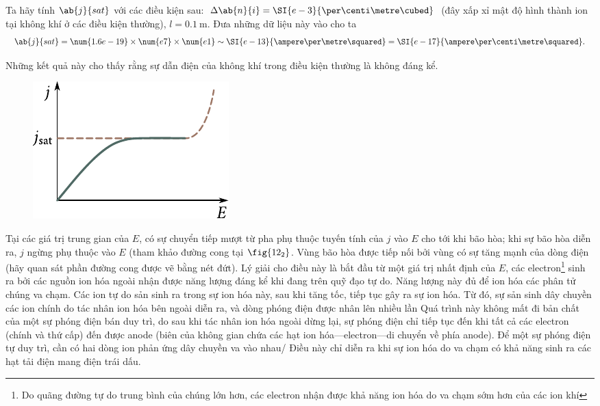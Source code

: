 Ta hãy tính $\ab{j}{sat}$ với các điều kiện sau: $\Delta{\ab{n}{i}} = \SI{e-3}{\per\centi\metre\cubed}$ (đây xấp xỉ mật độ hình thành ion tại không khí ở các điều kiện thường), $l = \SI{0.1}{\metre}$.
Đưa những dữ liệu này vào  cho ta
\begin{equation*}
    \ab{j}{sat} = \num{1.6e-19} \times \num{e7} \times \num{e1} \sim \SI{e-13}{\ampere\per\metre\squared} = \SI{e-17}{\ampere\per\centi\metre\squared}.
\end{equation*}

\noindent
Những kết quả này cho thấy rằng sự dẫn điện của không khí trong điều kiện thường là không đáng kể.

\begin{figure}[t]
	\begin{center}
		\includegraphics[scale=1]{figures/ch_12/fig_12_2.pdf}
		\caption[]{}
		\label{fig:12_2}
	\end{center}
	\vspace{-0.8cm}
\end{figure}

Tại các giá trị trung gian của $E$, có sự chuyển tiếp mượt từ pha phụ thuộc tuyến tính của $j$ vào $E$ cho tới khi bão hòa; khi sự bão hòa diễn ra, $j$ ngừng phụ thuộc vào $E$ (tham khảo đường cong tại $\fig{12_2}$.
Vùng bão hòa được tiếp nối bởi vùng có sự tăng mạnh của dòng điện (hãy quan sát phần đường cong được vẽ bằng nét đứt).
Lý giải cho điều này là bắt đầu từ một giá trị nhất định của $E$, các electron\footnote{Do quãng đường tự do trung bình của chúng lớn hơn, các electron nhận được khả năng ion hóa do va chạm sớm hơn của các ion khí} sinh ra bởi các nguồn ion hóa ngoài nhận được năng lượng đáng kể khi đang trên quỹ đạo tự do.
Năng lượng này đủ để ion hóa các phân tử chúng va chạm.
Các ion tự do sản sinh ra trong sự ion hóa này, sau khi tăng tốc, tiếp tục gây ra sự ion hóa.
Từ đó, sự sản sinh dây chuyền các ion chính do tác nhân ion hóa bên ngoài diễn ra, và dòng phóng điện được nhân lên nhiều lần
Quá trình này không mất đi bản chất của một sự phóng điện 
bán duy trì, do sau khi tác nhân ion hóa ngoài dừng lại, sự phóng điện chỉ tiếp tục đến khi tất cả các electron (chính và thứ cấp) đến được anode (biên của không gian chứa các hạt ion hóa---electron---di chuyển về phía anode).
Để một sự phóng điện tự duy trì, cần có hai dòng ion phản ứng dây chuyền va vào nhau/
Điều này chỉ diễn ra khi sự ion hóa do va chạm có khả năng sinh ra các hạt tải điện mang điện trái dấu.

